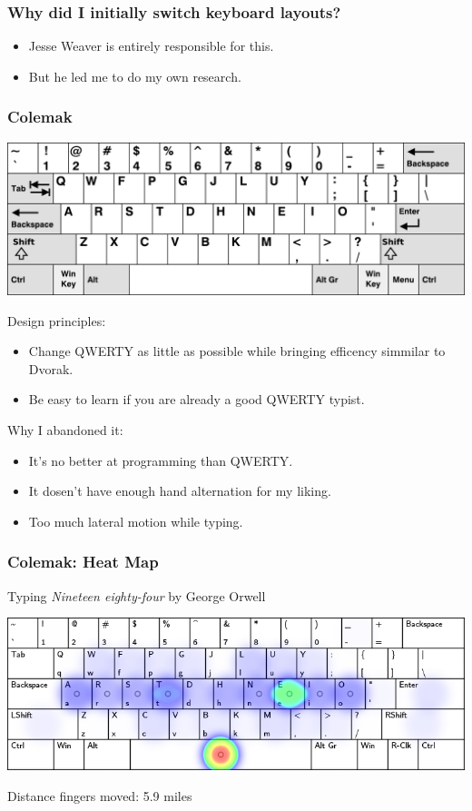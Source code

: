 \documentclass{beamer}
\begin{document}
\begin{frame}
    \frametitle{Why did I initially switch keyboard layouts?}
    \pause
    \begin{itemize}[<+->]
        \item Jesse Weaver is entirely responsible for this.
        \item But he led me to do my own research.
    \end{itemize}
\end{frame}

\begin{frame}
    \frametitle{Colemak}
    \begin{center}
        \includegraphics[width=0.8\linewidth]{graphics/colemak}\par
    \end{center}
    \pause
    Design principles:
    \begin{itemize}
        \item Change QWERTY as little as possible while bringing efficency
            simmilar to Dvorak.
        \item Be easy to learn if you are already a good QWERTY typist.
    \end{itemize}
    \pause
    Why I abandoned it:
    \begin{itemize}
        \item It's no better at programming than QWERTY.
        \item It dosen't have enough hand alternation for my liking.
        \item Too much lateral motion while typing.
    \end{itemize}
\end{frame}

\begin{frame}
    \frametitle{Colemak: Heat Map}
    Typing \emph{Nineteen eighty-four} by George Orwell
    \begin{center}
        \includegraphics[width=\linewidth]{graphics/colemakheat}\par
    Distance fingers moved: 5.9 miles
    \end{center}
\end{frame}
\end{document}
